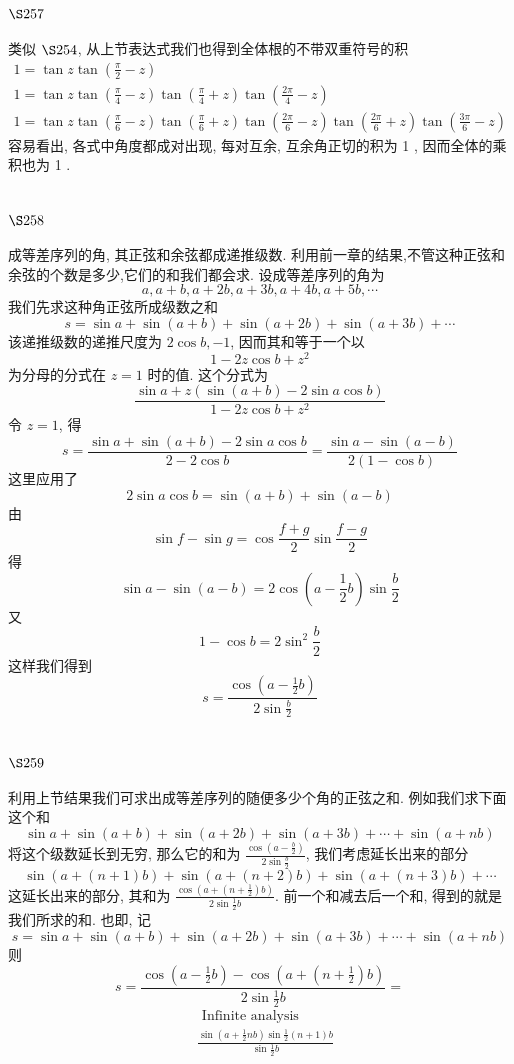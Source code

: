 \section{$\S 257$}

类似 $\S 254$, 从上节表达式我们也得到全体根的不带双重符号的积
\[
\begin{gathered}
1=\tan z \tan \left(\frac{\pi}{2}-z\right) \\
1=\tan z \tan \left(\frac{\pi}{4}-z\right) \tan \left(\frac{\pi}{4}+z\right) \tan \left(\frac{2 \pi}{4}-z\right) \\
1=\tan z \tan \left(\frac{\pi}{6}-z\right) \tan \left(\frac{\pi}{6}+z\right) \tan \left(\frac{2 \pi}{6}-z\right) \tan \left(\frac{2 \pi}{6}+z\right) \tan \left(\frac{3 \pi}{6}-z\right)
\end{gathered}
\]
容易看出, 各式中角度都成对出现, 每对互余, 互余角正切的积为 1 , 因而全体的乘 积也为 1 .

\section{$\S 258$}

成等差序列的角, 其正弦和余弦都成递推级数. 利用前一章的结果,不管这种正弦和 余弦的个数是多少,它们的和我们都会求. 设成等差序列的角为
\[
a, a+b, a+2 b, a+3 b, a+4 b, a+5 b, \cdots
\]
我们先求这种角正弦所成级数之和
\[
s=\sin a+\sin (a+b)+\sin (a+2 b)+\sin (a+3 b)+\cdots
\]
该递推级数的递推尺度为 $2 \cos b,-1$, 因而其和等于一个以
\[
1-2 z \cos b+z^{2}
\]
为分母的分式在 $z=1$ 时的值. 这个分式为
\[
\frac{\sin a+z(\sin (a+b)-2 \sin a \cos b)}{1-2 z \cos b+z^{2}}
\]
令 $z=1$, 得 
\[
s=\frac{\sin a+\sin (a+b)-2 \sin a \cos b}{2-2 \cos b}=\frac{\sin a-\sin (a-b)}{2(1-\cos b)}
\]
这里应用了
\[
2 \sin a \cos b=\sin (a+b)+\sin (a-b)
\]
由
\[
\sin f-\sin g=\cos \frac{f+g}{2} \sin \frac{f-g}{2}
\]
得
\[
\sin a-\sin (a-b)=2 \cos \left(a-\frac{1}{2} b\right) \sin \frac{b}{2}
\]
又
\[
1-\cos b=2 \sin ^{2} \frac{b}{2}
\]
这样我们得到
\[
s=\frac{\cos \left(a-\frac{1}{2} b\right)}{2 \sin \frac{b}{2}}
\]
\section{$\S 259$}

利用上节结果我们可求出成等差序列的随便多少个角的正弦之和. 例如我们求下面 这个和
\[
\sin a+\sin (a+b)+\sin (a+2 b)+\sin (a+3 b)+\cdots+\sin (a+n b)
\]
将这个级数延长到无穷, 那么它的和为 $\frac{\cos \left(a-\frac{b}{2}\right)}{2 \sin \frac{b}{2}}$, 我们考虑延长出来的部分
\[
\sin (a+(n+1) b)+\sin (a+(n+2) b)+\sin (a+(n+3) b)+\cdots
\]
这延长出来的部分, 其和为 $\frac{\cos \left(a+\left(n+\frac{1}{2}\right) b\right)}{2 \sin \frac{1}{2} b}$. 前一个和减去后一个和, 得到的就是我们所求的和. 也即, 记
\[
s=\sin a+\sin (a+b)+\sin (a+2 b)+\sin (a+3 b)+\cdots+\sin (a+n b)
\]
则
\[
s=\frac{\cos \left(a-\frac{1}{2} b\right)-\cos \left(a+\left(n+\frac{1}{2}\right) b\right)}{2 \sin \frac{1}{2} b}=
\]
\[
\begin{aligned}
& \text { Infinite analysis } \\
& \frac{\sin \left(a+\frac{1}{2} n b\right) \sin \frac{1}{2}(n+1) b}{\sin \frac{1}{2} b} 
\end{aligned}
\]
